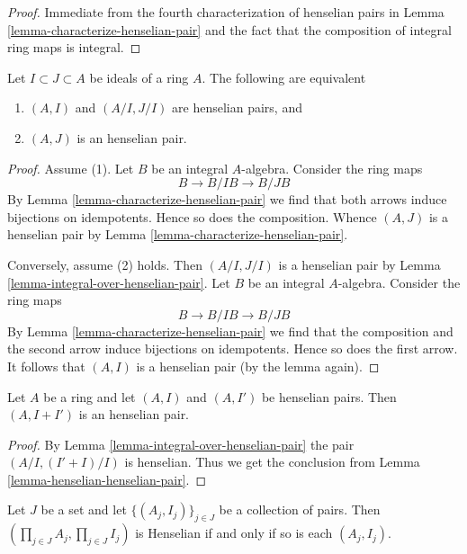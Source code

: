 \begin{proof}
Immediate from the fourth characterization of henselian pairs in
Lemma \ref{lemma-characterize-henselian-pair} and the fact that the
composition of integral ring maps is integral.
\end{proof}

\begin{lemma}
\label{lemma-henselian-henselian-pair}
Let $I \subset J \subset A$ be ideals of a ring $A$.
The following are equivalent
\begin{enumerate}
\item $(A, I)$ and $(A/I, J/I)$ are henselian pairs, and
\item $(A, J)$ is an henselian pair.
\end{enumerate}
\end{lemma}

\begin{proof}
Assume (1). Let $B$ be an integral $A$-algebra. Consider the ring maps
$$
B \to B/IB \to B/JB
$$
By Lemma \ref{lemma-characterize-henselian-pair} we find that
both arrows induce bijections on idempotents. Hence so does the
composition. Whence $(A, J)$ is a henselian pair
by Lemma \ref{lemma-characterize-henselian-pair}.

\medskip\noindent
Conversely, assume (2) holds. Then $(A/I, J/I)$ is a henselian pair
by Lemma \ref{lemma-integral-over-henselian-pair}. Let $B$ be an
integral $A$-algebra. Consider the ring maps
$$
B \to B/IB \to B/JB
$$
By Lemma \ref{lemma-characterize-henselian-pair} we find that the composition
and the second arrow induce bijections on idempotents.
Hence so does the first arrow. It follows that $(A, I)$ is a henselian
pair (by the lemma again).
\end{proof}

\begin{lemma}
\label{lemma-sum-henselian}
Let $A$ be a ring and let $(A, I)$ and $(A, I')$ be henselian pairs.
Then $(A, I + I')$ is an henselian pair.
\end{lemma}

\begin{proof}
By Lemma \ref{lemma-integral-over-henselian-pair} the pair
$(A/I, (I' + I)/I)$ is henselian. Thus we get the conclusion from
Lemma \ref{lemma-henselian-henselian-pair}.
\end{proof}

\begin{lemma}
\label{lemma-product-henselian-pairs}
Let $J$ be a set and let $\{ (A_j, I_j)\}_{j \in J}$ be a collection
of pairs. Then $(\prod_{j \in J} A_j, \prod_{j\in J} I_j)$ is Henselian
if and only if so is each $(A_j, I_j)$.
\end{lemma}
 
